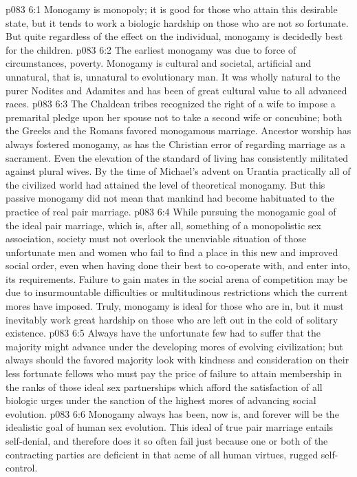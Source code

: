 \vs p083 6:1 Monogamy is monopoly; it is good for those who attain this desirable state, but it tends to work a biologic hardship on those who are not so fortunate. But quite regardless of the effect on the individual, monogamy is decidedly best for the children.
\vs p083 6:2 The earliest monogamy was due to force of circumstances, poverty. Monogamy is cultural and societal, artificial and unnatural, that is, unnatural to evolutionary man. It was wholly natural to the purer Nodites and Adamites and has been of great cultural value to all advanced races.
\vs p083 6:3 The Chaldean tribes recognized the right of a wife to impose a premarital pledge upon her spouse not to take a second wife or concubine; both the Greeks and the Romans favored monogamous marriage. Ancestor worship has always fostered monogamy, as has the Christian error of regarding marriage as a sacrament. Even the elevation of the standard of living has consistently militated against plural wives. By the time of Michael’s advent on Urantia practically all of the civilized world had attained the level of theoretical monogamy. But this passive monogamy did not mean that mankind had become habituated to the practice of real pair marriage.
\pc \vs p083 6:4 While pursuing the monogamic goal of the ideal pair marriage, which is, after all, something of a monopolistic sex association, society must not overlook the unenviable situation of those unfortunate men and women who fail to find a place in this new and improved social order, even when having done their best to co\hyp{}operate with, and enter into, its requirements. Failure to gain mates in the social arena of competition may be due to insurmountable difficulties or multitudinous restrictions which the current mores have imposed. Truly, monogamy is ideal for those who are in, but it must inevitably work great hardship on those who are left out in the cold of solitary existence.
\vs p083 6:5 Always have the unfortunate few had to suffer that the majority might advance under the developing mores of evolving civilization; but always should the favored majority look with kindness and consideration on their less fortunate fellows who must pay the price of failure to attain membership in the ranks of those ideal sex partnerships which afford the satisfaction of all biologic urges under the sanction of the highest mores of advancing social evolution.
\pc \vs p083 6:6 Monogamy always has been, now is, and forever will be the idealistic goal of human sex evolution. This ideal of true pair marriage entails self\hyp{}denial, and therefore does it so often fail just because one or both of the contracting parties are deficient in that acme of all human virtues, rugged self\hyp{}control.
